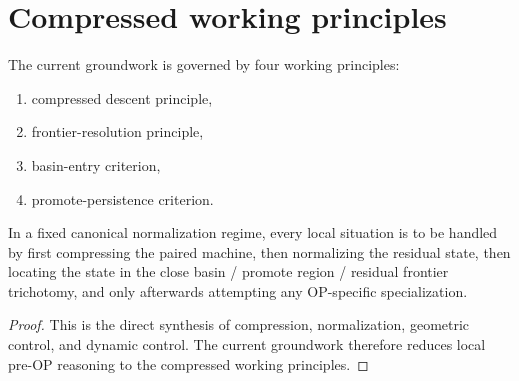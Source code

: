 \section{Compressed working principles}
\begin{definition}\label{def:compressed-working-principles}
The current groundwork is governed by four working principles:
\begin{enumerate}[leftmargin=2em]
  \item compressed descent principle,
  \item frontier-resolution principle,
  \item basin-entry criterion,
  \item promote-persistence criterion.
\end{enumerate}
\end{definition}

\begin{theorem}\label{thm:compressed-working-principle-theorem}
In a fixed canonical normalization regime, every local situation is to be handled by first compressing the paired machine, then normalizing the residual state, then locating the state in the close basin / promote region / residual frontier trichotomy, and only afterwards attempting any OP-specific specialization.
\end{theorem}

\begin{proof}
This is the direct synthesis of compression, normalization, geometric control, and dynamic control. The current groundwork therefore reduces local pre-OP reasoning to the compressed working principles.
\end{proof}

